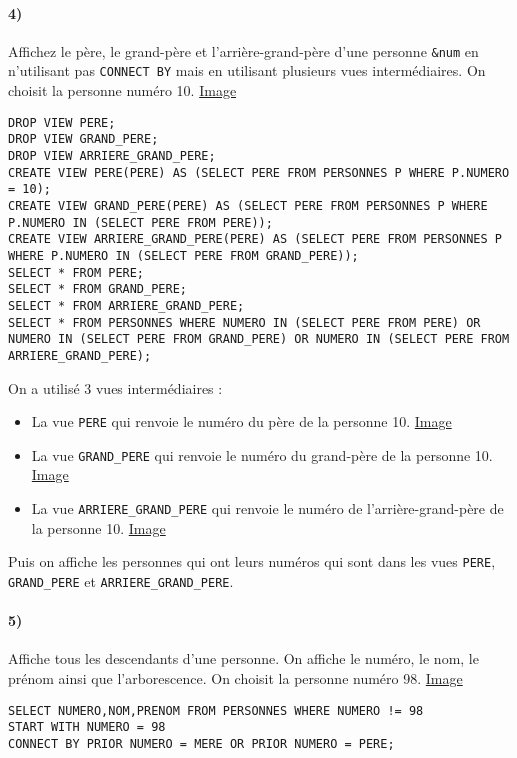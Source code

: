 \documentclass{report}
\begin{document}
\paragraph{4)}Affichez le père, le grand-père et l'arrière-grand-père d'une personne {\tt \&num} en n'utilisant pas {\tt CONNECT BY} mais en utilisant plusieurs vues intermédiaires. On choisit la personne numéro 10. \href{run:./Images/TP7/tp7_4.png}{Image}

\begin{lstlisting}
DROP VIEW PERE;
DROP VIEW GRAND_PERE;
DROP VIEW ARRIERE_GRAND_PERE;
CREATE VIEW PERE(PERE) AS (SELECT PERE FROM PERSONNES P WHERE P.NUMERO = 10);
CREATE VIEW GRAND_PERE(PERE) AS (SELECT PERE FROM PERSONNES P WHERE P.NUMERO IN (SELECT PERE FROM PERE));
CREATE VIEW ARRIERE_GRAND_PERE(PERE) AS (SELECT PERE FROM PERSONNES P WHERE P.NUMERO IN (SELECT PERE FROM GRAND_PERE));
SELECT * FROM PERE;
SELECT * FROM GRAND_PERE;
SELECT * FROM ARRIERE_GRAND_PERE;
SELECT * FROM PERSONNES WHERE NUMERO IN (SELECT PERE FROM PERE) OR NUMERO IN (SELECT PERE FROM GRAND_PERE) OR NUMERO IN (SELECT PERE FROM ARRIERE_GRAND_PERE);
\end{lstlisting}

On a utilisé 3 vues intermédiaires :
\begin{itemize}
	\item La vue {\tt PERE} qui renvoie le numéro du père de la personne 10. \href{run:./Images/TP7/tp7_vue1.png}{Image}
	\item La vue {\tt GRAND\_PERE} qui renvoie le numéro du grand-père de la personne 10. \href{run:./Images/TP7/tp7_vue2.png}{Image}
	\item La vue {\tt ARRIERE\_GRAND\_PERE} qui renvoie le numéro de l'arrière-grand-père de la personne 10. \href{run:./Images/TP7/tp7_vue3.png}{Image}
\end{itemize}

Puis on affiche les personnes qui ont leurs numéros qui sont dans les vues {\tt PERE}, {\tt GRAND\_PERE} et {\tt ARRIERE\_GRAND\_PERE}.

\paragraph{5)}Affiche tous les descendants d'une personne. On affiche le numéro, le nom, le prénom ainsi que l'arborescence. On choisit la personne numéro 98. \href{run:./Images/TP7/tp7_5.png}{Image}

\begin{lstlisting}
SELECT NUMERO,NOM,PRENOM FROM PERSONNES WHERE NUMERO != 98
START WITH NUMERO = 98
CONNECT BY PRIOR NUMERO = MERE OR PRIOR NUMERO = PERE;
\end{lstlisting}
\end{document}
